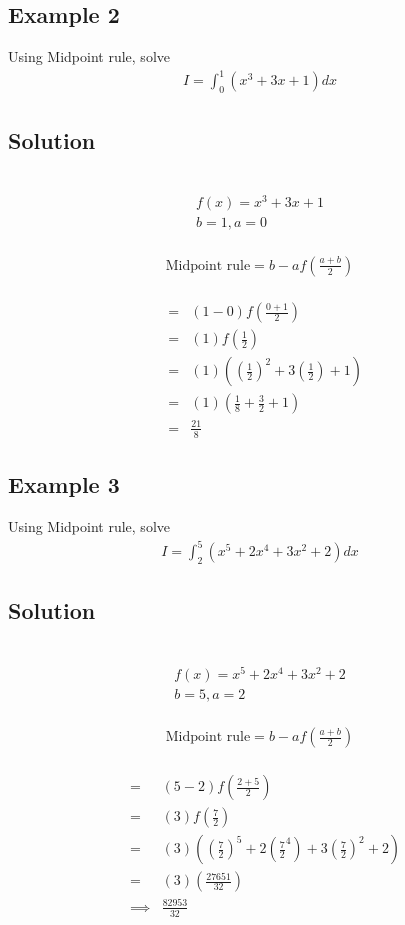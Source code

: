 \documentclass[12pt]{report}
\newcommand{\sps}{\\[0.2cm]}
\begin{document}
	\subsection{Example 2}
	Using Midpoint rule, solve
	\begin{eqnarray*}
		I = \int_0^1\left(x^3 + 3x + 1\right)dx
	\end{eqnarray*}
	
	\subsection*{Solution}
	{~}\\[-2.1cm]
	\begin{gather*}
		f(x) = x^3 + 3x + 1\sps
		b=1, a=0
	\end{gather*}
	{~}\\[-2.1cm]
	\begin{gather*}
		\text{Midpoint rule} = b-af\left(\frac{a+b}{2}\right)
	\end{gather*}
	{~}\\[-2.1cm]
	\begin{eqnarray*}
		&=&(1-0)f\left(\frac{0+1}{2}\right)\sps
		&=&(1)f\left(\frac{1}{2}\right)\sps
		&=&(1)\left(\left(\frac{1}{2}\right)^2 + 3\left(\frac{1}{2}\right) + 1\right)\sps
		&=&(1)\left(\frac{1}{8} + \frac{3}{2} + 1\right)\sps
		&=&\frac{21}{8}
	\end{eqnarray*}
	
	\subsection{Example 3}
	Using Midpoint rule, solve
	\begin{eqnarray*}
		I = \int_2^5\left(x^5 + 2x^4 + 3x^2 + 2\right)dx
	\end{eqnarray*}
	
	\subsection*{Solution}
	{~}\\[-2.1cm]
	\begin{gather*}
		f(x) = x^5 + 2x^4 + 3x^2 + 2\sps
		b=5, a=2
	\end{gather*}
	{~}\\[-2.1cm]
	\begin{gather*}
		\text{Midpoint rule} = b-af\left(\frac{a+b}{2}\right)
	\end{gather*}
	{~}\\[-2.1cm]
	\begin{eqnarray*}
		&=&(5-2)f\left(\frac{2+5}{2}\right)\sps
		&=&(3)f\left(\frac{7}{2}\right)\sps
		&=&(3)\left(\left(\frac{7}{2}\right)^5 + 2\left(\frac{7}{2}^4 \right)+ 3\left(\frac{7}{2}\right)^2 + 2\right)\sps
		&=&(3)\left(\frac{27651}{32}\right)\sps
		&\implies& \frac{82953}{32}
	\end{eqnarray*}
\end{document}
